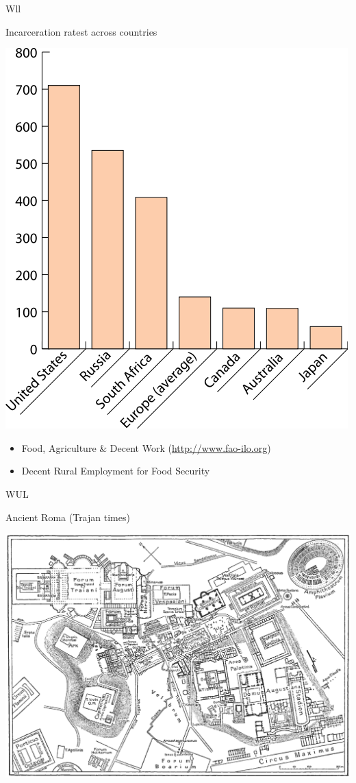 \begin{map}{W}{ll}
\caption{Incarceration ratest across countries}
\label{chart:incarceration}
\includegraphics[width=\chartwidth,height=\chartheight]{incarceration}  
\end{map}

\lipsum[1-4]

\begin{freading}
  \begin{itemize}
  \item Food, Agriculture \& Decent Work (\url{http://www.fao-ilo.org})
  \item Decent Rural Employment for  Food Security 
  \end{itemize}
\end{freading}

\begin{map}{W}{UL}
\caption{Ancient Roma  (Trajan times)}
\label{map:roma}
\includegraphics[width=\chartwidth,height=\chartheight]{Rome}
\end{map}

